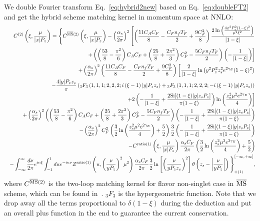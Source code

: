 \documentclass[prd,aps,twocolumn,preprintnumbers, showpacs, nofootinbib,superscriptaddress,notitlepage]{revtex4-2}
\def\bea{\begin{eqnarray}}
\def\eea{\end{eqnarray}}
\begin{document}
We double Fourier transform Eq.~\eqref{eq:hybrid2new} based on Eq.~\eqref{eq:doubleFT2} and get the hybrid scheme matching kernel in momentum space at NNLO:
\bea\label{eq:hybridkernelNNLO}
&&C^{(2)}\left(\xi,\frac{\mu}{|x|P_{z}}\right) = \Bigg\{ C^{\overline{\rm MS}(2)}\left(\xi,\frac{\mu}{|x|P_{z}}\right) -\left(\frac{\alpha_s}{2\pi}\right)^2 \left[\left(\frac{11 C_A C_F}{8}-\frac{C_F n_f T_F}{2}+\frac{9 C_F^2}{8}\right)\frac{2\ln\left(\frac{4 x^2 P_z^2 (1-\xi)^2}{\mu^2 \xi^2} \right)}{|1-\xi|} \right.\nonumber\\
&&\left.+\left(\left(\frac{53}{8}-\frac{\pi ^2}{6}\right) C_A C_F+\left(\frac{25}{8}+\frac{2\pi ^2}{3}\right) C_F^2 -\frac{5 C_F n_f T_F}{2}\right)\left(-\frac{1}{|1-\xi|}\right) \right] \nonumber\\
&&+\left(\frac{\alpha_s}{2\pi}\right)^2 \left(\frac{11 C_A C_F}{8}-\frac{C_F n_f T_F}{2}+\frac{9 C_F^2}{8}\right)\left[\frac{2}{|1-\xi|}\ln \left(y^2 P_z^2 z_s^2 e^{2 \gamma_{E}} (1-\xi)^2 \right) \right. \nonumber\\ 
&&\left. -\frac{4|y|P_z z_s}{\pi}\left( { }_{3} F_{3}\left(1,1,1 ; 2,2,2 ; i\left(\xi-1\right) |y|P_z z_s\right)+{ }_{3} F_{3}\left(1,1,1 ; 2,2,2 ;-i\left(\xi-1\right) |y|P_z z_s\right) \right) \right. \nonumber\\ 
&&\left. +2\left(-\frac{1}{|1-\xi|}+\frac{2 {\rm Si}[(1-\xi)|y| z_s P_z]}{\pi (1-\xi)} \right)\ln \left(\frac{z_s^{2}\mu^{2}e^{2\gamma_E}}{4}\right) \right] \nonumber\\ 
&&+\left(\frac{\alpha_s}{2\pi}\right)^2 \left(\left(\frac{53}{8}-\frac{\pi ^2}{6}\right) C_A C_F+\left(\frac{25}{8}+\frac{2\pi ^2}{3}\right) C_F^2 -\frac{5 C_F n_f T_F}{2}\right)\left(-\frac{1}{|1-\xi|}+\frac{2 {\rm Si}[(1-\xi)|y| z_s P_z]}{\pi (1-\xi)} \right) \nonumber\\ 
&&-\left(\frac{\alpha_s}{2\pi}\right)^2 C_F^2 \left(\frac{3}{2}\ln\left(\frac{z_s^{2}\mu^{2}e^{2\gamma_E}}{4}\right)+\frac{5}{2}\right)\frac{3}{2}\left(-\frac{1}{|1-\xi|}+\frac{2 {\rm Si}[(1-\xi)|y| z_s P_z]}{\pi (1-\xi)} \right) \nonumber\\ 
&&-C^{\rm ratio(1)}\left(\xi,\frac{\mu}{|x|P_z}\right)\frac{\alpha_{s}C_{F}}{2 \pi}\left(\frac{3}{2}\ln\left(\frac{z_s^{2}\mu^{2}e^{2\gamma_E}}{4}\right)+\frac{5}{2}\right) \nonumber\\
&&-\int_{-\infty}^{\infty} \frac{d \nu}{2 \pi} e^{i \nu \xi} \int_{-1}^{1} d u e^{-i u \nu} Z^{\rm ratio(1)}\left(u,\left(\frac{\nu}{y P_{z}}\right)^{2} \mu^{2}\right)\frac{\alpha_s C_{F}}{2 \pi}\frac{3}{2}\ln\left[\left(\frac{\nu}{y P_{z}z_s}\right)^{2}\right]\theta\left(z_s-\left|\frac{\nu}{y P_{z}}\right|\right) \Bigg\}_{+(1)}^{[-\infty,+\infty]},
\eea
where $C^{\overline{\rm MS}(2)}$ is the two-loop matching kernel for flavor non-singlet case in $\overline{\rm MS}$ scheme, which can be found in~\cite{Li:2020xml,Chen:2020ody}. ${ }_{3} F_{3}$ is the hypergeometric function. Note that we drop away all the terms proportional to $\delta(1-\xi)$ during the deduction and put an overall plus function in the end to guarantee the current conservation.
\end{document}
